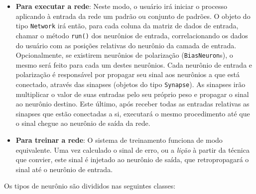 \begin{itemize}
\item \textbf{Para executar a rede}: Neste modo, o usuário irá iniciar o
processo aplicando à entrada da rede um padrão ou conjunto de padrões. O
objeto do tipo \texttt{Network} irá então, para cada coluna da matriz de dados
de entrada, chamar o método \texttt{run()} dos neurônios de entrada,
correlacionando os dados do usuário com as posições relativas do neurônio da
camada de entrada. Opcionalmente, se existirem neurônios de polarização
(\texttt{BiasNeuron}s), o mesmo será feito para cada um destes neurônios. Cada
neurônio de entrada e polarização é responsável por propagar seu sinal aos
neurônios a que está conectado, através das sinapses (objetos do tipo
\texttt{Synapse}). As sinapses irão multiplicar o valor de suas entradas pelo
seu próprio peso e propagar o sinal ao neurônio destino. Este último, após
receber todas as entradas relativas as sinapses que estão conectadas a si,
executará o mesmo procedimento até que o sinal chegue ao neurônio de saída da
rede.

\item \textbf{Para treinar a rede}: O sistema de treinamento funciona de 
modo equivalente. Uma vez calculado o sinal de erro, ou a \textit{lição} à
partir da técnica que convier, este sinal é injetado ao neurônio de saída, que
retropropagará o sinal até o neurônio de entrada.
\end{itemize}

Os tipos de neurônio são divididos nas seguintes classes:

